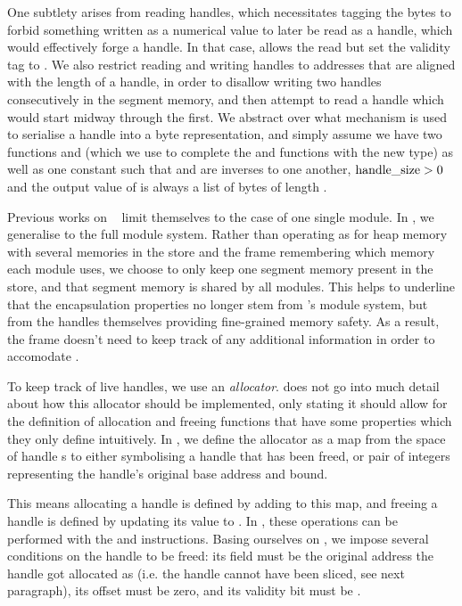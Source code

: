 \documentclass[acmsmall,screen]{acmart}\settopmatter{}
\begin{document}
One subtlety arises from reading handles, which necessitates tagging the bytes to forbid something written as a numerical value to later be read as a handle, which would effectively forge a handle. In that case, \mswasm allows the read but set the validity tag to \xxCfalse. We also restrict reading and writing handles to addresses that are aligned with the length of a handle, in order to disallow writing two handles consecutively in the segment memory, and then attempt to read a handle which would start midway through the first. We abstract over what mechanism is used to serialise a handle into a byte representation, and simply assume we have two functions \xxWserialisehandle and \xxWdeserialisehandle (which we use to complete the \xxWserialise and \xxWdeserialise functions with the new \xxWhandle type) as well as one constant \xxWhandlesize such that \xxWserialisehandle and \xxWdeserialisehandle are inverses to one another, \( \mathrm{handle\_size} > 0 \) and the output value of \xxWserialisehandle is always a list of bytes of length \xxWhandlesize.

Previous works on \mswasm~\cite{mswasm} limit themselves to the case of one single module. In \irismswasm, we generalise to the full module system. Rather than operating as for heap memory with several memories in the store and the frame remembering which memory each module uses, we choose to only keep one segment memory present in the store, and that segment memory is shared by all modules. This helps to underline that the encapsulation properties no longer stem from \wasm's module system, but from the handles themselves providing fine-grained memory safety. As a result, the frame doesn't need to keep track of any additional information in order to accomodate \mswasm.

To keep track of live handles, we use an \emph{allocator}. \citet{mswasm} does not go into much detail about how this allocator should be implemented, only stating it should allow for the definition of allocation and freeing functions that have some properties which they only define intuitively. In \irismswasm, we define the allocator as a map from the space of handle \xxWid{}s to either \xxNone symbolising a handle that has been freed, or \xxSome pair of integers representing the handle's original base address and bound.

This means allocating a handle is defined by adding to this map, and freeing a handle is defined by updating its value to \xxNone. In \mswasm, these operations can be performed with the \xxWsegalloc and \xxWsegfree instructions. Basing ourselves on \citet{mswasm}, we impose several conditions on the handle to be freed: its  field must be the original address the handle got allocated as (i.e. the handle cannot have been sliced, see next paragraph), its offset must be zero, and its validity bit must be \xxCtrue.
\end{document}
